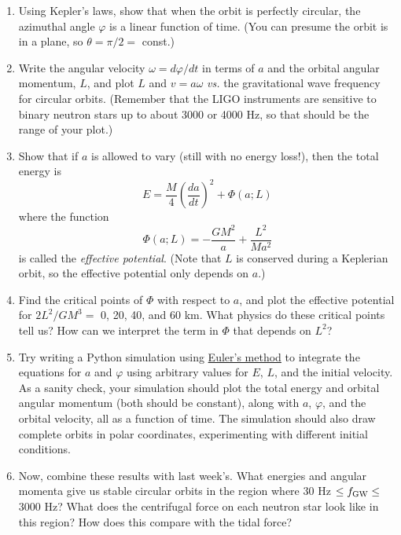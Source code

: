 \documentclass[11pt]{article}
\begin{document}
\begin{enumerate}

\item Using Kepler's laws, show that when the orbit is perfectly circular, the azimuthal angle $\varphi$ is a linear function of time. (You can presume the orbit is in a plane, so $\theta = \pi/2 =$ const.)

\item Write the angular velocity $\omega = d\varphi/dt$ in terms of $a$ and the orbital angular momentum, $L$, and plot $L$ and $v=a\omega$ \textit{vs.} the gravitational wave frequency for circular orbits. (Remember that the LIGO instruments are sensitive to binary neutron stars up to about 3000 or 4000 Hz, so that should be the range of your plot.)

\item Show that if $a$ is allowed to vary (still with no energy loss!), then the total energy is
\begin{equation}
E = \frac{M}{4}\left(\frac{da}{dt}\right)^2 + \Phi(a; L)
\end{equation}
where the function
\begin{equation}
\Phi(a; L) = - \frac{GM^2}{a} + \frac{L^2}{Ma^2}
\end{equation}
is called the \textit{effective potential}. (Note that $L$ is conserved during a Keplerian orbit, so the effective potential only depends on $a$.)

\item Find the critical points of $\Phi$ with respect to $a$, and plot the effective potential for $2L^2/GM^3 =$ 0, 20, 40, and 60 km. What physics do these critical points tell us? How can we interpret the term in $\Phi$ that depends on $L^2$?

\item Try writing a Python simulation using \href{https://en.wikipedia.org/wiki/Euler_method}{Euler's method} to integrate the equations for $a$ and $\varphi$ using arbitrary values for $E$, $L$, and the initial velocity. As a sanity check, your simulation should plot the total energy and orbital angular momentum (both should be constant), along with $a$, $\varphi$, and the orbital velocity, all as a function of time. The simulation should also draw complete orbits in polar coordinates, experimenting with different initial conditions.

\item Now, combine these results with last week's. What energies and angular momenta give us stable circular orbits in the region where 30 Hz $\leq f_{\rm GW} \leq$ 3000 Hz? What does the centrifugal force on each neutron star look like in this region? How does this compare with the tidal force?

\end{enumerate}
\end{document}
